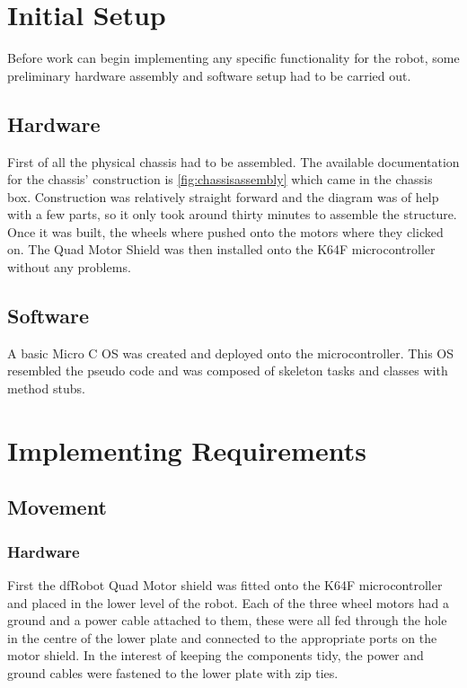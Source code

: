 		\section{Initial Setup}
		Before work can begin implementing any specific functionality for the robot, some preliminary hardware assembly and software setup had to be carried out.
			
			\subsection{Hardware}
			First of all the physical chassis had to be assembled. The available documentation for the chassis' construction is \ref{fig:chassisassembly} which came in the chassis box. Construction was relatively straight forward and the diagram was of help with a few parts, so it only took around thirty minutes to assemble the structure. Once it was built, the wheels where pushed onto the motors where they clicked on. The Quad Motor Shield was then installed onto the K64F microcontroller without any problems.
				
			\subsection{Software}
			A basic Micro C OS was created and deployed onto the microcontroller. This OS resembled the pseudo code and was composed of skeleton tasks and classes with method stubs.
			
		\section{Implementing Requirements}
			\subsection{Movement}
				\subsubsection{Hardware}
				First the dfRobot Quad Motor shield was fitted onto the K64F microcontroller and placed in the lower level of the robot. Each of the three wheel motors had a ground and a power cable attached to them, these were all fed through the hole in the centre of the lower plate and connected to the appropriate ports on the motor shield. In the interest of keeping the components tidy, the power and ground cables were fastened to the lower plate with zip ties.
				
